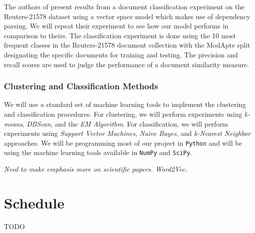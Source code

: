 \documentclass[11pt]{article}
\begin{document}
The authors of \cite{Nastase2007} present results from a document classification experiment on the Reuters-21578 dataset using a vector space model which makes use of dependency parsing. We will repeat their experiment to see how our model performs in comparison to theirs. The classification experiment is done using the 10 most frequent classes in the Reuters-21578 document collection with the ModApte split designating the specific documents for training and testing. The precision and recall scores are used to judge the performance of a document similarity measure. 

\subsubsection{Clustering and Classification Methods}

We will use a standard set of machine learning tools to implement the clustering and classification procedures. For clustering, we will perform experiments using \emph{k-means}, \emph{DBScan}, and the \emph{EM Algorithm}. For classification, we will perform experiments using \emph{Support Vector Machines}, \emph{Naive Bayes}, and \emph{k-Nearest Neighbor} approaches. We will be programming most of our project in {\tt Python} and will be using the machine learning tools available in {\tt NumPy} and {\tt SciPy}.

\begin{framed}
\emph{Need to make emphasis more on scientific papers. Word2Vec.}
\end{framed}




\section{Schedule}

TODO


\nocite{*}



  
  
\end{document}
